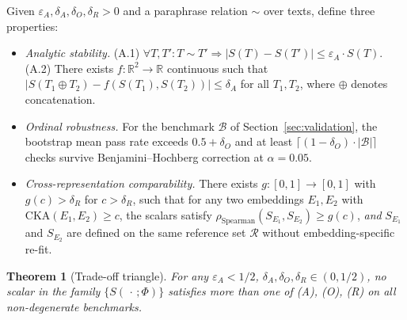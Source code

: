 \documentclass[11pt]{article}
\newtheorem{theorem}{Theorem}
\begin{document}
Given $\varepsilon_A, \delta_A, \delta_O, \delta_R > 0$ and a paraphrase relation $\sim$ over texts, define three properties:

\begin{itemize}
\item[\textbf{(A)}] \emph{Analytic stability.} (A.1) $\forall T, T' : T \sim T' \Rightarrow |S(T)-S(T')| \leq \varepsilon_A \cdot S(T)$. (A.2) There exists $f : \mathbb{R}^2 \to \mathbb{R}$ continuous such that $|S(T_1 \oplus T_2) - f(S(T_1), S(T_2))| \leq \delta_A$ for all $T_1, T_2$, where $\oplus$ denotes concatenation.
\item[\textbf{(O)}] \emph{Ordinal robustness.} For the benchmark $\mathcal{B}$ of Section~\ref{sec:validation}, the bootstrap mean pass rate exceeds $0.5 + \delta_O$ and at least $\lceil (1-\delta_O) \cdot |\mathcal{B}| \rceil$ checks survive Benjamini--Hochberg correction at $\alpha = 0.05$.
\item[\textbf{(R)}] \emph{Cross-representation comparability.} There exists $g: [0,1] \to [0,1]$ with $g(c) > \delta_R$ for $c > \delta_R$, such that for any two embeddings $E_1, E_2$ with $\mathrm{CKA}(E_1, E_2) \geq c$, the scalars satisfy $\rho_{\mathrm{Spearman}}(S_{E_1}, S_{E_2}) \geq g(c)$, \emph{and} $S_{E_1}$ and $S_{E_2}$ are defined on the same reference set $\mathcal{R}$ without embedding-specific re-fit.
\end{itemize}

\begin{theorem}[Trade-off triangle]\label{thm:nogo}
For any $\varepsilon_A < 1/2$, $\delta_A, \delta_O, \delta_R \in (0, 1/2)$, no scalar in the family $\{S(\,\cdot\,; \Phi)\}$ satisfies more than one of \textup{(A)}, \textup{(O)}, \textup{(R)} on all non-degenerate benchmarks.
\end{theorem}
\end{document}
